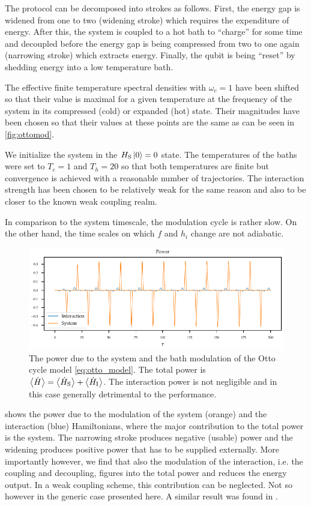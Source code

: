 The protocol can be decomposed into strokes as follows. First, the
energy gap is widened from one to two (widening stroke) which requires
the expenditure of energy. After this, the system is coupled to a hot
bath to ``charge'' for some time and decoupled before the energy gap
is being compressed from two to one again (narrowing stroke) which
extracts energy. Finally, the qubit is being ``reset'' by shedding
energy into a low temperature bath.

The effective finite temperature spectral densities with \(ω_{c}=1\)
have been shifted so that their value is maximal for a given
temperature at the frequency of the system in its compressed (cold) or
expanded (hot) state. Their magnitudes have been chosen so that their
values at these points are the same as can be seen in
\cref{fig:ottomod}.

We initialize the system in the \(H_{\mathrm{S}}\ket{0}=0\) state. The
temperatures of the baths were set to \(T_{c}=1\) and \(T_{h}=20\) so
that both temperatures are finite but convergence is achieved with a
reasonable number of trajectories. The interaction strength has been
chosen to be relatively weak for the same reason and also to be closer
to the known weak coupling realm.

In comparison to the system timescale, the modulation cycle is rather
slow. On the other hand, the time scales on which \(f\) and \(h_{i}\)
change are not adiabatic.

\begin{figure}[htp]
  \centering
  \includegraphics{figs/otto/power}
  \caption{\label{fig:ottopower} The power due to the system and the
    bath modulation of the Otto cycle model \cref{eq:otto_model}. The
    total power is
    \(\ev{\dot{H}} = \ev{\dot{H}_{\sys}} +
    \ev{\dot{H}_{\inter}}\). The interaction power is not negligible
    and in this case generally detrimental to the performance.}
\end{figure}
 shows the power due to the modulation of the
system (orange) and the interaction (blue) Hamiltonians, where the
major contribution to the total power is the system. The narrowing
stroke produces negative (usable) power and the widening produces
positive power that has to be supplied externally. More importantly
however, we find that also the modulation of the interaction, i.e. the
coupling and decoupling, figures into the total power and reduces the
energy output. In a weak coupling scheme, this contribution can be
neglected. Not so however in the generic case presented here. A
similar result was found in .


